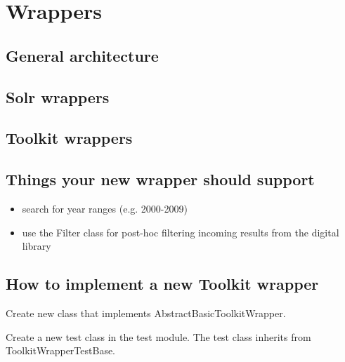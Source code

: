 \documentclass[12pt]{book}
\newcommand{\lllhome}{../../../examples/src/main/java/de/unidue/inf/is/ezdl/examples/}
\begin{document}












%
%
%
%
%
\chapter{Wrappers \label{ch:wrappers}}

\section{General architecture}  
  
\section{Solr wrappers}  

\section{Toolkit wrappers}
  
  
\section{Things your new wrapper should support}

\begin{itemize}
\item search for year ranges (e.g. 2000-2009)
\item use the Filter class for post-hoc filtering incoming results from the digital library
\end{itemize}
 
 
 
\section{How to implement a new Toolkit wrapper}

Create new class that implements AbstractBasicToolkitWrapper.

Create a new test class in the test module. The test class inherits from ToolkitWrapperTestBase.
\end{document}
